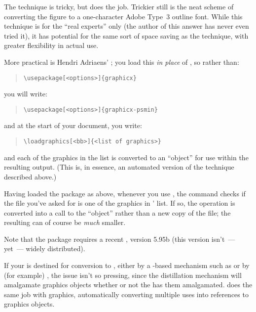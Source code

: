 The  technique is tricky, but does the job.  Trickier
still is the neat scheme of converting the figure to a one-character
Adobe Type~3 outline font.  While this technique is for the ``real
experts'' only (the author of this answer has never even tried it), it has
potential for the same sort of space saving as the 
technique, with greater flexibility in actual use.

More practical is Hendri Adriaens' ; you load
this \emph{in place} of , so rather than:
\begin{quote}
\begin{verbatim}
\usepackage[<options>]{graphicx}
\end{verbatim}
\end{quote}
you will write:
\begin{quote}
\begin{verbatim}
\usepackage[<options>]{graphicx-psmin}
\end{verbatim}
\end{quote}
and at the start of your document, you write:
\begin{quote}
\begin{verbatim}
\loadgraphics[<bb>]{<list of graphics>}
\end{verbatim}
\end{quote}
and each of the graphics in the list is converted to an ``object'' for
use within the resulting \PS{} output.  (This is, in essence, an
automated version of the  technique described above.)

Having loaded the package as above, whenever you use
, the command checks if the file you've asked for
is one of the graphics in ' list.  If so, the
operation is converted into a call to the ``object'' rather than a new
copy of the file; the resulting \PS{} can of course be \emph{much} smaller.

Note that the package requires a recent , version
5.95b (this version isn't~--- yet~--- widely distributed).

If your \PS{} is destined for conversion to , either by a
\href{http://www.ghostscript.com/}{}-based
mechanism such as  or by
(for example)  , the issue isn't
so pressing, since the distillation mechanism will amalgamate graphics
objects whether or not the \PS{} has them amalgamated.  \PDFTeX{} does
the same job with graphics, automatically converting multiple uses
into references to graphics objects.
\begin{ctanrefs}
\item[graphicx-psmin.sty]
\end{ctanrefs}

